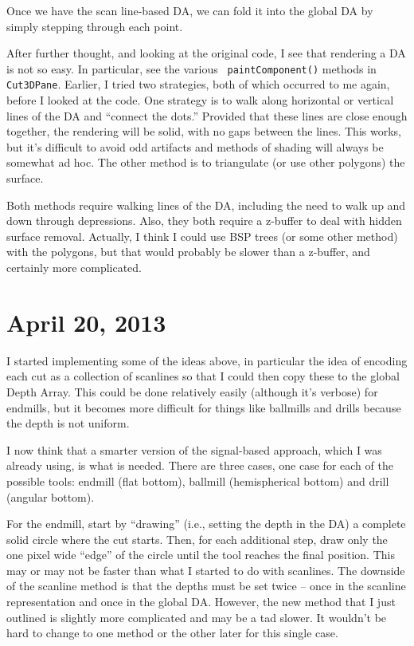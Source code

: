 \documentclass[titlepage,oneside,10pt]{article}
\begin{document}
Once we have the scan line-based DA, we can fold it into the global DA
by simply stepping through each point.

After further thought, and looking at the original code, I see that
rendering a DA is not so easy. In particular, see the various {\tt
  paintComponent()} methods in {\tt Cut3DPane}. Earlier, I tried two
strategies, both of which occurred to me again, before I looked at the
code. One strategy is to walk along horizontal or vertical lines of
the DA and ``connect the dots.'' Provided that these lines are close
enough together, the rendering will be solid, with no gaps between the
lines. This works, but it's difficult to avoid odd artifacts and
methods of shading will always be somewhat ad hoc. The other method is
to triangulate (or use other polygons) the surface.

Both methods require walking lines of the DA, including the need to
walk up and down through depressions. Also, they both require a
z-buffer to deal with hidden surface removal. Actually, I think I
could use BSP trees (or some other method) with the polygons, but that
would probably be slower than a z-buffer, and certainly more complicated.

\section{April 20, 2013}

I started implementing some of the ideas above, in particular the idea
of encoding each cut as a collection of scanlines so that I could then
copy these to the global Depth Array. This could be done relatively
easily (although it's verbose) for endmills, but it becomes more
difficult for things like ballmills and drills because the depth is
not uniform.

I now think that a smarter version of the signal-based approach, which
I was already using, is what is needed. There are three cases, one
case for each of the possible tools: endmill (flat bottom), ballmill
(hemispherical bottom) and drill (angular bottom). 

For the endmill, start by ``drawing'' (i.e., setting the depth in the
DA) a complete solid circle where the cut starts. Then, for each
additional step, draw only the one pixel wide ``edge'' of the circle
until the tool reaches the final position. This may or may not be
faster than what I started to do with scanlines. The downside of the
scanline method is that the depths must be set twice -- once in the
scanline representation and once in the global DA. However, the new
method that I just outlined is slightly more complicated and may be a
tad slower. It wouldn't be hard to change to one method or the other
later for this single case.
\end{document}

